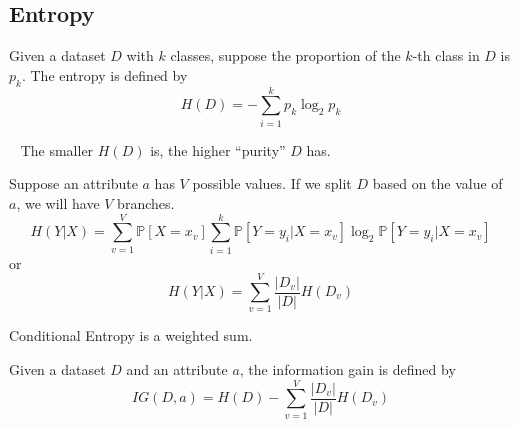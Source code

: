     \subsection{Entropy}
    \begin{definition}[Entropy]
        Given a dataset $D$ with $k$ classes, suppose the proportion of the $k$-th class in $D$ is $p_k$. The entropy is defined by
        \[ H(D) = -\sum_{i=1}^k p_k \log_2 p_k \]
    \end{definition}
    \begin{remark}~{}
            The smaller $H(D)$ is, the higher ``purity'' $D$ has.
    \end{remark}

    \begin{definition}
        Suppose an attribute $a$ has $V$ possible values. If we split $D$ based on the value of $a$, we will have $V$ branches.
        \[ H(Y|X) = \sum_{v=1}^V \mathbb{P}[X=x_v]\sum_{i=1}^k\mathbb{P}[Y=y_i|X=x_v]\log_2\mathbb{P}[Y=y_i|X=x_v] \]
        or
        \[ H(Y|X) = \sum_{v=1}^V\frac{|D_v|}{|D|}H(D_v) \]
    \end{definition}
    \begin{remark}
        Conditional Entropy is a weighted sum.
    \end{remark}

    \begin{definition}
        Given a dataset $D$ and an attribute $a$, the information gain is defined by
        \[ IG(D,a) = H(D) - \sum_{v=1}^V\frac{|D_v|}{|D|}H(D_v) \]
    \end{definition}